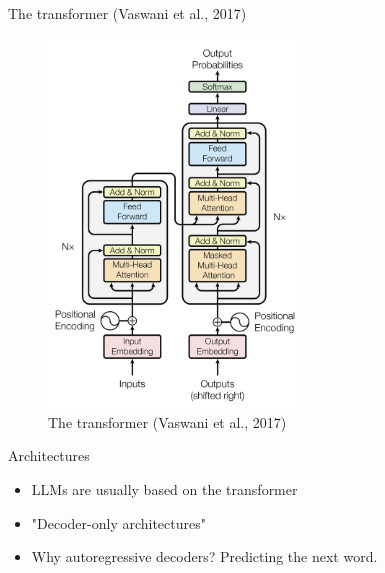 \documentclass[10pt]{beamer}
\begin{document}
\begin{frame}{The transformer (Vaswani et al., 2017)}

\begin{figure}[h]
\centering
\includegraphics[width=0.6\textwidth]{fig/Vaswani_1_transformer}
\caption{The transformer (Vaswani et al., 2017)}
\end{figure}

\end{frame}

\begin{frame}{Architectures}

\begin{itemize}
\item LLMs are usually based on the transformer 
\item "Decoder-only architectures"
\item Why autoregressive decoders? Predicting the next word.
\end{itemize}

\end{frame}
\end{document}
